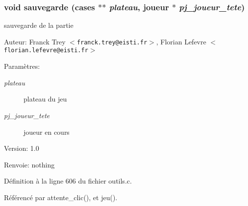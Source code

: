 \subsubsection{\setlength{\rightskip}{0pt plus 5cm}void sauvegarde ({\bf cases} $\ast$$\ast$ {\em plateau}, {\bf joueur} $\ast$ {\em pj\_\-joueur\_\-tete})}\label{outils_8c_113ece66046fa3db3fed49a3ada1b36e}


sauvegarde de la partie 

\begin{Desc}
\item[Auteur:]Franck Trey $<${\tt franck.trey@eisti.fr}$>$, Florian Lefevre $<${\tt florian.lefevre@eisti.fr}$>$\end{Desc}
\begin{Desc}
\item[Param\`{e}tres:]
\begin{description}
\item[{\em plateau}]plateau du jeu \item[{\em pj\_\-joueur\_\-tete}]joueur en cours\end{description}
\end{Desc}
\begin{Desc}
\item[Version:]1.0 \end{Desc}
\begin{Desc}
\item[Renvoie:]nothing \end{Desc}


D\'{e}finition \`{a} la ligne 606 du fichier outils.c.

R\'{e}f\'{e}renc\'{e} par attente\_\-clic(), et jeu().

